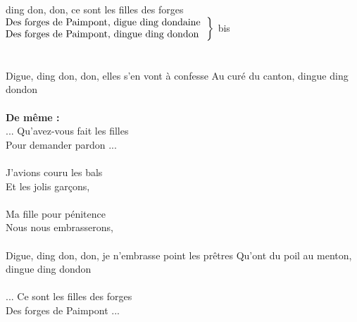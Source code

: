 
ding don, don, ce sont les filles des forges \bissimple\\
$\left.\begin{tabular}{l}
\hspace{-0.4cm}
Des forges de Paimpont, digue ding dondaine
\\
\hspace{-0.4cm}
Des forges de Paimpont, dingue ding dondon 
\end{tabular}\right\rbrace$ bis
\\\\\\Digue, ding don, don, elles s'en vont à confesse \bissimple
{}
{Au curé du canton, dingue ding dondon}
\\\\\textbf{De même :}
\\... Qu'avez-vous fait les filles
\\Pour demander pardon ...
\\\\J'avions couru les bals
\\Et les jolis garçons, 
\\\\Ma fille pour pénitence
\\Nous nous embrasserons,
\\\\Digue, ding don, don, je n'embrasse point les prêtres \bissimple
{}
{Qu'ont du poil au menton, dingue ding dondon}
\\\\... Ce sont les filles des forges
\\Des forges de Paimpont ...

\breakpage